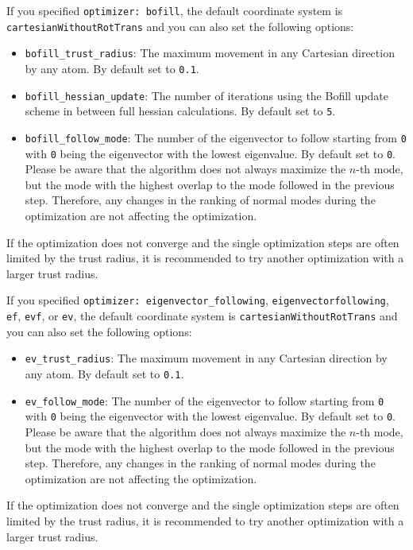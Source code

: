 \documentclass[]{tufte-book}
\begin{document}
If you specified \texttt{optimizer: bofill}, the default coordinate system is \texttt{cartesianWithoutRotTrans}
and you can also set the following options:
\begin{itemize}
\item \texttt{bofill\_trust\_radius}: The maximum movement in any Cartesian direction by any atom. By default set to \texttt{0.1}.
\item \texttt{bofill\_hessian\_update}: The number of iterations using the Bofill update scheme in between full hessian calculations.
By default set to \texttt{5}.
\item \texttt{bofill\_follow\_mode}: The number of the eigenvector to follow starting from \texttt{0} with \texttt{0} being the eigenvector with the lowest eigenvalue. By default set to \texttt{0}. Please be aware that the algorithm does not always maximize the $n$-th mode, but the mode with the highest overlap to the mode followed in the previous step. Therefore, any changes in the ranking of normal modes during the optimization are not affecting the optimization.
\end{itemize}
If the optimization does not converge and the single optimization steps are often limited by the trust radius, it is recommended to try another optimization with a larger trust radius.

If you specified \texttt{optimizer: eigenvector\_following}, \texttt{eigenvectorfollowing}, \texttt{ef}, \texttt{evf}, or \texttt{ev},
the default coordinate system is \texttt{cartesianWithoutRotTrans}
and you can also set the following options:
\begin{itemize}
\item \texttt{ev\_trust\_radius}: The maximum movement in any Cartesian direction by any atom. By default set to \texttt{0.1}.
\item \texttt{ev\_follow\_mode}: The number of the eigenvector to follow starting from \texttt{0} with \texttt{0} being the eigenvector with the lowest eigenvalue. By default set to \texttt{0}. Please be aware that the algorithm does not always maximize the $n$-th mode, but the mode with the highest overlap to the mode followed in the previous step. Therefore, any changes in the ranking of normal modes during the optimization are not affecting the optimization.
\end{itemize}
If the optimization does not converge and the single optimization steps are often limited by the trust radius, it is recommended to try another optimization with a larger trust radius.
\end{document}
